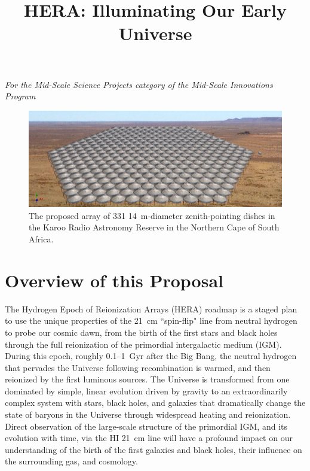 \documentclass[preprint]{aastex}
\newcommand{\Caption}[4]{\vspace{#1}\renewcommand{\baselinestretch}{#2}\caption{#4}\vspace{#3}}
\def\HI{{H{\small I }}}
\begin{document}
\title{HERA: Illuminating Our Early Universe}
{\it For the Mid-Scale Science Projects category of the Mid-Scale
Innovations Program}

\begin{figure}[H]\centering
\includegraphics[width=6in]{plots/hera331perspect2.jpg}
\Caption{-0.1in}{0.9}{-0.1in}{\small
The proposed array of 331 14~m-diameter zenith-pointing dishes in the Karoo Radio Astronomy Reserve
in the Northern Cape of South Africa.}\label{fig:hera_array} \end{figure}


\vspace{-0.4in}
\section{Overview of this Proposal} %


The Hydrogen Epoch of Reionization Arrays (HERA) roadmap is a staged
plan to use the unique properties of the 21~cm ``spin-flip" line from neutral
hydrogen to probe our cosmic dawn, from the birth of the first 
stars and black holes through the full reionization of the primordial
intergalactic medium (IGM). During this epoch, roughly 0.1--1~Gyr after the Big Bang, 
the neutral hydrogen that pervades the Universe 
following recombination is warmed, and then reionized by the first luminous sources. 
The Universe is transformed from one dominated by simple,
linear evolution driven by gravity to an extraordinarily complex system with stars, black holes, and galaxies that
dramatically change the state of baryons in the Universe through widespread heating and reionization.
Direct observation of the large-scale structure of the primordial
IGM, and its evolution with time, via the \HI 21~cm line will
have a profound impact on our understanding of the birth of the first
galaxies and black holes, their influence on the surrounding gas,
and cosmology. 
\end{document}
